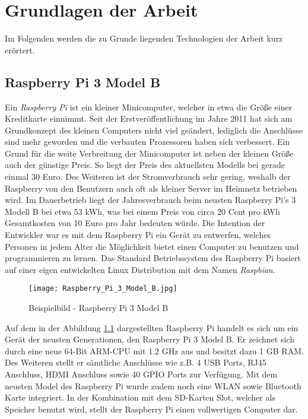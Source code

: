 
\chapter{Grundlagen der Arbeit}

Im Folgenden werden die zu Grunde liegenden Technologien der Arbeit kurz erörtert.

\section{Raspberry Pi 3 Model B}
Ein \textit{Raspberry Pi} ist ein kleiner Minicomputer, welcher in etwa die
Größe einer Kreditkarte einnimmt. Seit der Erstveröffentlichung im Jahre 2011
hat sich am Grundkonzept des kleinen Computers nicht viel
geändert, lediglich die Anschlüsse sind mehr geworden und die verbauten
Prozessoren haben sich verbessert. 
Ein Grund für die weite Verbreitung der Minicomputer ist neben der kleinen
Größe auch der günstige Preis. So liegt der Preis des aktuellsten Modells bei
gerade einmal 30 Euro. Des Weiteren ist der Stromverbrauch sehr gering,
weshalb der Raspberry von den Benutzern auch oft als kleiner Server im Heimnetz
betrieben wird. Im Dauerbetrieb liegt der Jahresverbrauch beim neusten Raspberry
Pi's 3 Modell B bei etwa 53 kWh, was bei einem Preis von
circa 20 Cent pro kWh Gesamtkosten von 10 Euro pro Jahr bedeuten würde. \newline
Die Intention der Entwickler war es mit dem Raspberry Pi ein Gerät zu
entwerfen, welches Personen in jedem Alter die Möglichkeit bietet einen
Computer zu benutzen und programmieren zu lernen. Das Standard Betriebssystem
des Raspberry Pi basiert auf einer eigen entwickelten Linux Distribution mit
dem Namen \textit{Raspbian}.
\autocite{what_is_a_raspberry_pi?_2019}
\begin{figure}[h]
	\centering
	\texttt{[image: Raspberry\_Pi\_3\_Model\_B.jpg]}
	\caption{Beispielbild - Raspberry Pi 3 Model B \autocite{raspberry_pi_2019}}
	\label{img:grafik-RaspberryPi3}
\end{figure}
\newline

Auf dem in der Abbildung \ref{img:grafik-RaspberryPi3} dargestellten Raspberry
Pi handelt es sich um ein Gerät der neusten Generationen, den Raspberry Pi 3
Model B. Er zeichnet sich durch eine neue 64-Bit \ac{ARM}-\ac{CPU} mit 1.2
\ac{GHz} aus und besitzt dazu 1 \ac{GB} \ac{RAM}. Des Weiteren stellt er
sämtliche Anschlüsse wie z.B. 4 \ac{USB} Ports, RJ45 Anschluss, \ac{HDMI}
Anschluss sowie 40 \ac{GPIO} Ports zur Verfügung. Mit dem neusten Model des
Raspberry Pi wurde zudem noch eine \ac{WLAN} sowie Bluetooth Karte integriert.
In der Kombination mit dem \ac{SD-Karten} Slot, welcher als Speicher benutzt
wird, stellt der Raspberry Pi einen vollwertigen Computer dar.
\autocite{kurniawan_2016}
 

